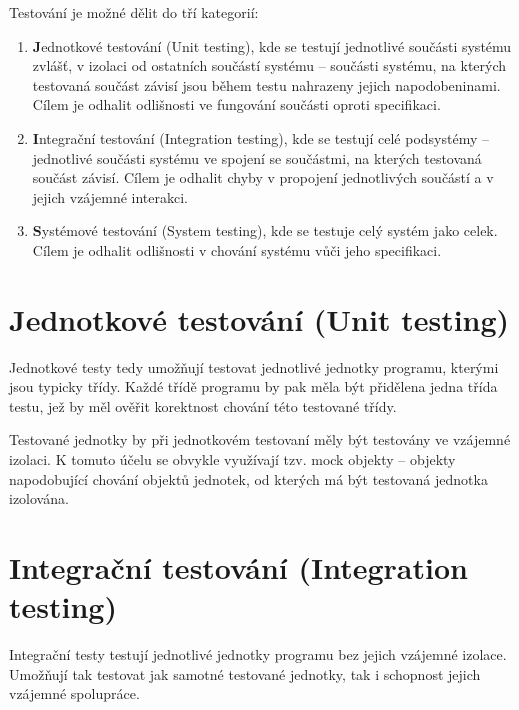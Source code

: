 Testování je možné dělit do tří kategorií:

\begin{enumerate}
  \item {\textbf Jednotkové testování (Unit testing)}, kde se testují jednotlivé součásti systému zvlášť, v izolaci od ostatních součástí systému -- součásti systému, na kterých testovaná součást závisí jsou během testu nahrazeny jejich napodobeninami. Cílem je odhalit odlišnosti ve fungování součásti oproti specifikaci. \cite{ivsTest}
  \item {\textbf Integrační testování (Integration testing)}, kde se testují celé podsystémy -- jednotlivé součásti systému ve spojení se součástmi, na kterých testovaná součást závisí. Cílem je odhalit chyby v propojení jednotlivých součástí a v jejich vzájemné interakci. \cite{ivsTest}
  \item {\textbf Systémové testování (System testing)}, kde se testuje celý systém jako celek. Cílem je odhalit odlišnosti v chování systému vůči jeho specifikaci. \cite{ivsTest}
\end{enumerate}


\section{Jednotkové testování (Unit testing)}

Jednotkové testy tedy umožňují testovat jednotlivé jednotky programu, kterými jsou typicky třídy. Každé třídě programu by pak měla být přidělena jedna třída testu, jež by měl ověřit korektnost chování této testované třídy.

Testované jednotky by při jednotkovém testovaní měly být testovány ve vzájemné izolaci. K tomuto účelu se obvykle využívají tzv. mock objekty -- objekty napodobující chování objektů jednotek, od kterých má být testovaná jednotka izolována.



\section{Integrační testování (Integration testing)}

Integrační testy testují jednotlivé jednotky programu bez jejich vzájemné izolace. Umožňují tak testovat jak samotné testované jednotky, tak i schopnost jejich vzájemné spolupráce.




